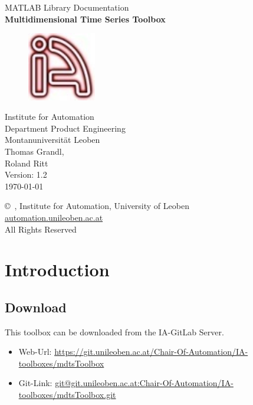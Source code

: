 \documentclass[a4]{scrreprt}
\begin{document}
	
\begin{titlepage}
	\centering
	
	\large MATLAB Library Documentation\\[2cm]
		
	\huge\textbf{Multidimensional Time Series Toolbox}\\[1cm]
	
	\begin{figure}[!h]
		\centering
		\includegraphics[width=3cm]{Media/IALogo.jpg}
	\end{figure}
	
	\vspace{1cm}
	
	\Large Institute for Automation\\[0.3cm]
	
	\normalsize
	Department Product Engineering\\[0.3cm]
	Montanuniversit\"at Leoben\\[2cm]

	\Large Thomas Grandl,\\Roland Ritt\\[2cm]		
	
	\large Version: 1.2\\
	\large \today
	
	\vfill
	
	\copyright\ \the\year, Institute for Automation, University of Leoben\\
	\url{automation.unileoben.ac.at}\\
	All Rights Reserved
	
\end{titlepage}

\tableofcontents

\chapter{Introduction}
\section{Download}
This toolbox can be downloaded from the IA-GitLab Server.
\begin{itemize}
	\item Web-Url: \url{https://git.unileoben.ac.at/Chair-Of-Automation/IA-toolboxes/mdtsToolbox}
	\item Git-Link: \url{git@git.unileoben.ac.at:Chair-Of-Automation/IA-toolboxes/mdtsToolbox.git}
\end{itemize}
\end{document}

